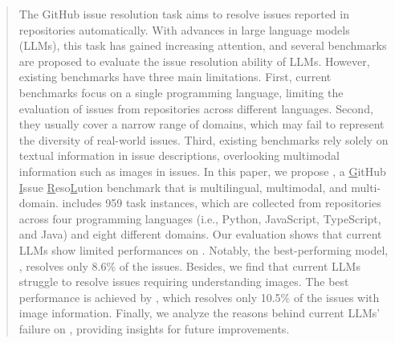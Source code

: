 \documentclass[acmsmall,screen]{acmart}
\begin{document}
\author{Zibin Zheng}


\renewcommand{\shortauthors}{L. Guo, W. Tao, R. Jang, Y. Wang, J. Chen, X. Liu, Y. Ma, M. Mao, H. Zhang, Z. Zheng}

\begin{abstract}
The GitHub issue resolution task aims to resolve issues reported in repositories automatically. With advances in large language models (LLMs), this task has gained increasing attention, and several benchmarks are proposed to evaluate the issue resolution ability of LLMs. However, existing benchmarks have three main limitations. First, current benchmarks focus on a single programming language, limiting the evaluation of issues from repositories across different languages. Second, they usually cover a narrow range of domains, which may fail to represent the diversity of real-world issues. Third, existing benchmarks rely solely on textual information in issue descriptions, overlooking multimodal information such as images in issues. In this paper, we propose \Swebenchx, a \underline{G}itHub \underline{I}ssue \underline{R}eso\underline{L}ution benchmark that is multilingual, multimodal, and multi-domain.  \Swebenchx includes 959 task instances, which are collected from repositories across four programming languages (i.e., Python, JavaScript, TypeScript, and Java) and eight different domains. Our evaluation shows that current LLMs show limited performances on \Swebenchx. Notably, the best-performing model, \GPT, resolves only 8.6\% of the issues. Besides, we find that current LLMs struggle to resolve issues requiring understanding images. The best performance is achieved by \Claude, which resolves only 10.5\% of the issues with image information. Finally, we analyze the reasons behind current LLMs' failure on \Swebenchx, providing insights for future improvements.
\end{abstract}
\end{document}
